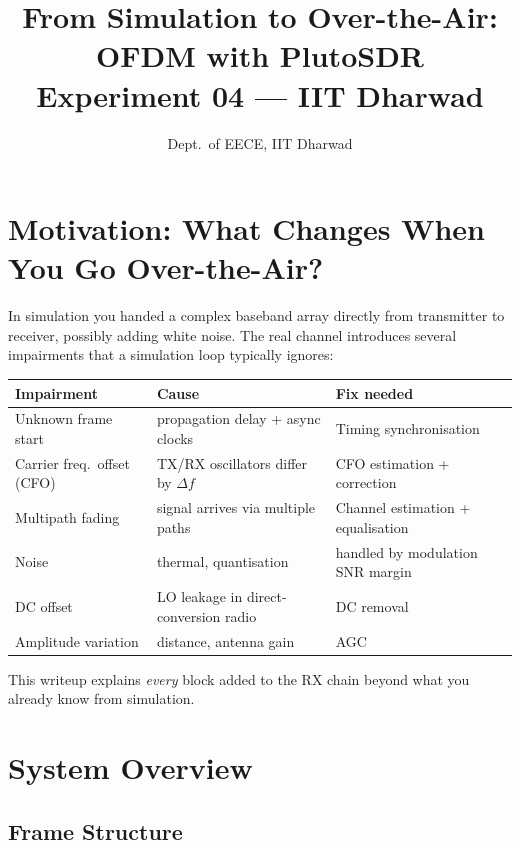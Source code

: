 \documentclass[11pt,a4paper]{article}
\title{\textbf{From Simulation to Over-the-Air:\\
OFDM with PlutoSDR}\\\large Experiment 04 --- IIT Dharwad}
\author{Dept.\ of EECE, IIT Dharwad}
\date{}
\begin{document}
\maketitle
\tableofcontents
\bigskip

\section{Motivation: What Changes When You Go Over-the-Air?}

In simulation you handed a complex baseband array directly from transmitter to
receiver, possibly adding white noise.  The real channel introduces several
impairments that a simulation loop typically ignores:

\begin{center}
\begin{tabular}{p{4cm}p{5.5cm}p{4.5cm}}
\toprule
\textbf{Impairment} & \textbf{Cause} & \textbf{Fix needed} \\
\midrule
Unknown frame start & propagation delay + async clocks & Timing synchronisation \\
Carrier freq.\ offset (CFO) & TX/RX oscillators differ by $\Delta f$ & CFO estimation + correction \\
Multipath fading & signal arrives via multiple paths & Channel estimation + equalisation \\
Noise & thermal, quantisation & handled by modulation SNR margin \\
DC offset & LO leakage in direct-conversion radio & DC removal \\
Amplitude variation & distance, antenna gain & AGC \\
\bottomrule
\end{tabular}
\end{center}

This writeup explains \emph{every} block added to the RX chain beyond what you
already know from simulation.

\section{System Overview}

\subsection{Frame Structure}
\end{document}
